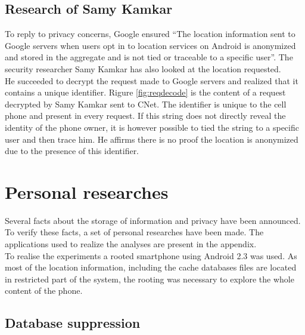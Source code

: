 \subsection{Research of Samy Kamkar}
\label{sec:andro-samy}

To reply to privacy concerns, Google ensured ``The location information sent to Google servers when users opt in to location services on Android is anonymized and stored in the aggregate and is not tied or traceable to a specific user''\cite{loc-not-traceable}.
The security researcher Samy Kamkar has also looked at the location requested.\\


He succeeded to decrypt the request made to Google servers and realized that it contains a unique identifier\cite{cnet-andr-samy}.
Rigure \ref{fig:reqdecode} is the content of a request decrypted by Samy Kamkar sent to CNet.
The identifier is unique to the cell phone and present in every request.
If this string does not directly reveal the identity of the phone owner, it is however possible to tied the string to a specific user and then trace him.
He affirms there is no proof the location is anonymized due to the presence of this identifier.\\

\section{Personal researches}
Several facts about the storage of information and privacy have been announced.
To verify these facts, a set of personal researches have been made.
The applications used to realize the analyses are present in the appendix.\\

To realise the experiments a rooted smartphone using Android 2.3 was used.
As most of the location information, including the cache databases files are located in restricted part of the system, the rooting was necessary to explore the whole content of the phone.

\subsection{Database suppression}

